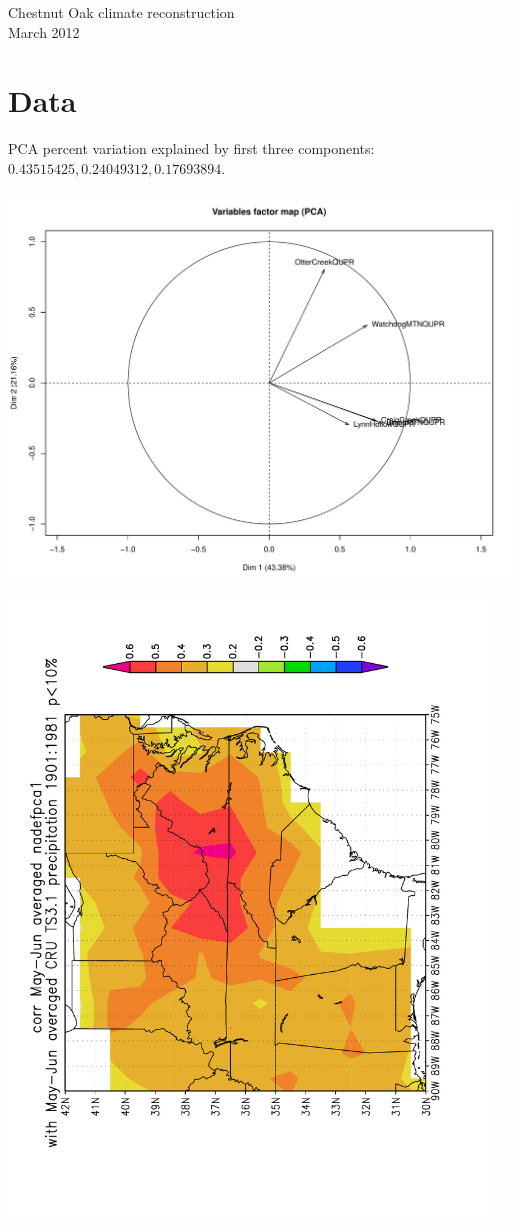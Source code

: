 \documentclass{article}
\begin{document}
\begin{center}
{\large Chestnut Oak climate reconstruction}\\
{March 2012}
\end{center}

\section{Data}




PCA percent variation explained by first three components: $0.43515425, 0.24049312, 0.17693894$.

\includegraphics[width=7in]{factorMap.pdf}


\includegraphics[width=5in, angle=-90]{MJPrecipmap.pdf}
\end{document}
